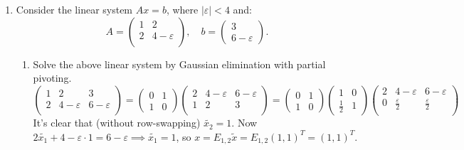 \documentclass[11pt]{article}
\newcommand{\n}{\vspace{0.3cm}}
\begin{document}
\begin{enumerate}
	\item Consider the linear system \(Ax = b\), where \(|\varepsilon| < 4\) and:
	      \[
		      A = \left(\begin{array}{cc} 1 & 2 \\ 2 & 4-\varepsilon \\ \end{array}\right), \quad
		      b = \left(\begin{array}{c} 3 \\ 6-\varepsilon \end{array}\right).
	      \]
	      \begin{enumerate}
		      \item Solve the above linear system by Gaussian elimination with partial pivoting.
		            \[
			            \left(\begin{array}{rr|r}
					            1 & 2             & 3             \\
					            2 & 4-\varepsilon & 6-\varepsilon \\
				            \end{array}\right)
			            =
			            \begin{pmatrix} 0 & 1 \\ 1 & 0 \end{pmatrix}
			            \left(\begin{array}{rr|r}
					            2 & 4-\varepsilon & 6-\varepsilon \\
					            1 & 2             & 3             \\
				            \end{array}\right)
			            =
			            \begin{pmatrix} 0 & 1 \\ 1 & 0 \end{pmatrix}
			            \begin{pmatrix} 1 & 0 \\ \tfrac12 & 1 \end{pmatrix}
			            \left(\begin{array}{rr|r}
					            2 & 4-\varepsilon      & 6-\varepsilon      \\
					            0 & \tfrac\varepsilon2 & \tfrac\varepsilon2 \\
				            \end{array}\right)
		            \]
		            It's clear that (without row-swapping) \(\tilde{x_2}=1\).  Now \(2\tilde{x_1} + 4-\varepsilon \cdot 1 = 6 - \varepsilon \implies \tilde{x_1}=1\), so \(x = E_{1,2}\tilde{x} = E_{1,2}(1,1)^T = (1,1)^T\). \n


\end{enumerate}
\end{enumerate}
\end{document}

